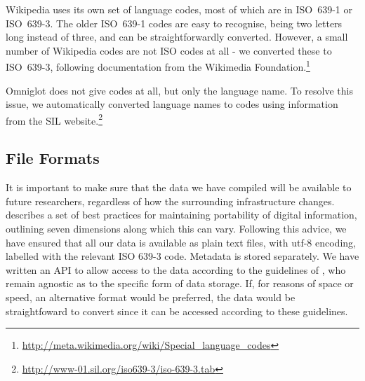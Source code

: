 Wikipedia uses its own set of language codes, most of which are in ISO~639-1 or ISO~639-3.  The older ISO~639-1 codes are easy to recognise, being two letters long instead of three, and can be straightforwardly converted.  However, a small number of Wikipedia codes are not ISO codes at all - we converted these to ISO~639-3, following documentation from the Wikimedia Foundation.\footnote{\url{http://meta.wikimedia.org/wiki/Special\_language\_codes}}

Omniglot does not give codes at all, but only the language name. To resolve this issue, we automatically converted language names to codes using information from the SIL website.\footnote{\url{http://www-01.sil.org/iso639-3/iso-639-3.tab}}



\subsection{File Formats}

It is important to make sure that the data we have compiled will be available to future researchers, regardless of how the surrounding infrastructure changes.  describes a set of best practices for maintaining portability of digital information, outlining seven dimensions along which this can vary. Following this advice, we have ensured that all our data is available as plain text files, with utf-8 encoding, labelled with the relevant ISO 639-3 code. Metadata is stored separately. We have written an API to allow access to the data according to the guidelines of , who remain agnostic as to the specific form of data storage. If, for reasons of space or speed, an alternative format would be preferred, the data would be straightfoward to convert since it can be accessed according to these guidelines.
